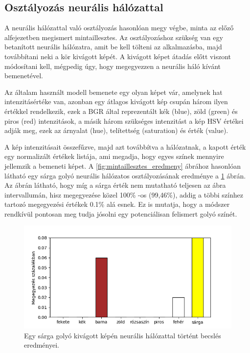 \subsection{Osztályozás neurális hálózattal}
A neurális hálózattal való osztályozás hasonlóan megy végbe, minta az előző alfejezetben megismert mintaillesztes. Az osztályozáshoz szükség van egy betanított neurális hálózatra, amit be kell tölteni az alkalmazásba, majd továbbítani neki a kör kivágott képét. A kivágott képet átadás előtt viszont módosítani kell, mégpedig úgy, hogy megegyezzen a neurális háló kívánt bemenetével.
\par Az általam használt modell bemenete egy olyan képet vár, amelynek hat intenzitásértéke van, azonban egy átlagos kivágott kép csupán három ilyen értékkel rendelkezik, ezek a BGR által reprezentált kék (blue), zöld (green) és piros (red) intenzitások, a másik három szükséges intenzitást a kép HSV értékei adják meg, ezek az árnyalat (hue), telítettség (saturation) és érték (value).
\par A kép intenzitásait összefűzve, majd azt továbbítva a hálózatnak, a kapott érték egy normalizált értékek listája, ami megadja, hogy egyes színek mennyire jellemzik a bemeneti képet. A \ref{fig:mintaillesztes_eredmeny} ábrához hasonlóan látható egy sárga golyó neurális hálózatos osztályozásának eredménye a \ref{fig:neuralis_osztalyozas_eredmeny} ábrán. Az ábrán látható, hogy míg a sárga érték nem mutatható teljesen az ábra intervallumán, hisz megegyezése közel 100\% -os (99,46\%), addig a többi színhez tartozó megegyezési értékek 0.1\% alá esnek. Ez is mutatja, hogy a módszer rendkívül pontosan meg tudja jósolni egy potenciálisan felismert golyó színét.

\begin{figure}[!ht]
    \centering
    \includegraphics[width=140mm, keepaspectratio]{figures/neural_values.png}
    \caption{Egy sárga golyó kivágott képén neurális hálózattal történt becslés eredményei.}
    \label{fig:neuralis_osztalyozas_eredmeny}
\end{figure}

